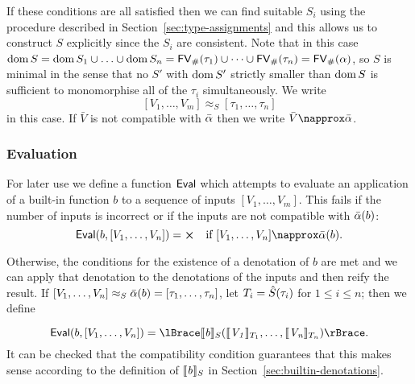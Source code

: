 \noindent If these conditions are all satisfied then we can find suitable $S_i$
using the procedure described in Section~\ref{sec:type-assignments} and this
allows us to construct $S$ explicitly since the $S_i$ are consistent.  Note that
in this case $\operatorname{dom} S = \operatorname{dom} S_1 \cup \ldots \cup \operatorname{dom} S_n = \mathsf{FV}_{\#}(\tau_1) \cup
\cdots \cup \mathsf{FV}_{\#}(\tau_n) = \mathsf{FV}_{\#}(\alpha)$, so $S$ is minimal in the sense that no
$S'$ with $\operatorname{dom} S'$ strictly smaller than $\operatorname{dom} S$ is sufficient
to monomorphise all of the $\tau_i$ simultaneously.  We write
$$
[V_1, \ldots, V_m] \approx_S [\tau_1, \ldots, \tau_n]
$$
in this case.  If $\bar{V}$ is not compatible with $\bar{\alpha}$ then we write
$\bar{V} \napprox \alphabar$.%

\subsubsection{Evaluation}
\label{sec:eval}
For later use we define a function $\mathsf{Eval}$ which attempts to evaluate an
application of a built-in function $b$ to a sequence of inputs $[V_1, \ldots,
  V_m]$.  This fails if the number of inputs is incorrect or if the inputs are
not compatible with $\bar{\alpha}(b)$:
$$
\Eval(b,[V_1, \ldots, V_n]) = \errorX \quad \text{if $[V_1, \ldots, V_n] \napprox \alphabar(b)$}.
$$

\noindent Otherwise, the conditions for the existence of a denotation of $b$ are
met and we can apply that denotation to the denotations of the inputs and then
reify the result. If $[V_1, \ldots, V_n] \approx_S \bar{\alpha}(b) = [\tau_1,
  \ldots, \tau_n]$, let $T_i = \hat{S}(\tau_i)$ for $1 \leq i \leq n$; then we
define

$$
\Eval(b,[V_1, \ldots, V_n]) = \reify{\denote{b}_S (\denote{V_1}_{T_1}, \ldots, \denote{V_n}_{T_n})}.
$$%
%
%
\noindent It can be checked that the compatibility condition guarantees that
this makes sense according to the definition of $\llbracket\mathit{b}\rrbracket_S$ in
Section~\ref{sec:builtin-denotations}.

